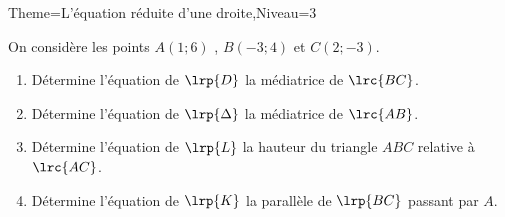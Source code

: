 \documentclass[a4paper,12pt]{article}
\begin{document}
\begin{Maquette}[Fiche]{Theme=L'équation réduite d'une droite,Niveau=3}
\begin{exercice}
On considère les points  $A(1;6)$ , $B(-3;4)$ et $C(2;-3)$.
\begin{enumerate}
\item Détermine l'équation de $\lrp{D}$ la médiatrice de $\lrc{BC}$.
\item Détermine l'équation de $\lrp{\Delta}$ la médiatrice de $\lrc{AB}$.
\item Détermine l'équation de $\lrp{L}$ la hauteur du triangle $ABC$ relative à $\lrc{AC}$.
\item  Détermine l'équation de $\lrp{K}$ la parallèle  de $\lrp{BC}$ passant par $A$.
\end{enumerate}
\end{exercice}














\end{Maquette}
\end{document}
